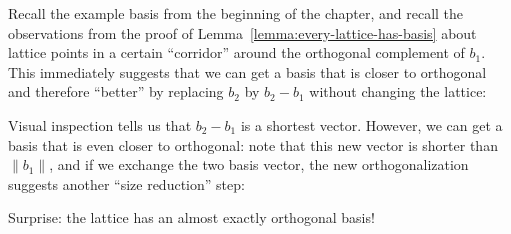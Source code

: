Recall the example basis from the beginning of the chapter,
and recall the observations from the proof of Lemma~\ref{lemma:every-lattice-has-basis}
about lattice points in a certain ``corridor'' around the orthogonal complement of $b_1$.
This immediately suggests that we can get a basis that is closer to orthogonal and therefore ``better''
by replacing $b_2$ by $b_2 - b_1$ without changing the lattice:
\begin{center}
\end{center}
Visual inspection tells us that $b_2 - b_1$ is a shortest vector.
However, we can get a basis that is even closer to orthogonal:
note that this new vector is shorter than $\|b_1\|$,
and if we exchange the two basis vector, the new orthogonalization suggests another ``size reduction'' step:
\begin{center}
\end{center}
Surprise: the lattice has an almost exactly orthogonal basis!

